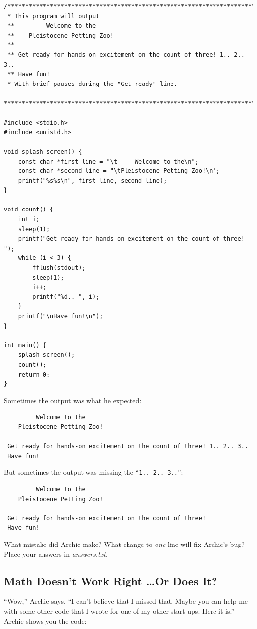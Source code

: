 \begin{lstlisting}
/***********************************************************************
 * This program will output
 **         Welcome to the
 **    Pleistocene Petting Zoo!
 **
 ** Get ready for hands-on excitement on the count of three! 1.. 2.. 3..
 ** Have fun!
 * With brief pauses during the "Get ready" line.
 ***********************************************************************/

#include <stdio.h>
#include <unistd.h>

void splash_screen() {
    const char *first_line = "\t     Welcome to the\n";
    const char *second_line = "\tPleistocene Petting Zoo!\n";
    printf("%s%s\n", first_line, second_line);
}

void count() {
    int i;
    sleep(1);
    printf("Get ready for hands-on excitement on the count of three! ");
    while (i < 3) {
        fflush(stdout);
        sleep(1);
        i++;
        printf("%d.. ", i);
    }
    printf("\nHave fun!\n");
}

int main() {
    splash_screen();
    count();
    return 0;
}
\end{lstlisting}

Sometimes the output was what he expected:
\begin{verbatim}
         Welcome to the
    Pleistocene Petting Zoo!

 Get ready for hands-on excitement on the count of three! 1.. 2.. 3..
 Have fun!
\end{verbatim}

But sometimes the output was missing the
``\texttt{1.. 2.. 3..}'':
\begin{verbatim}
         Welcome to the
    Pleistocene Petting Zoo!

 Get ready for hands-on excitement on the count of three!
 Have fun!
\end{verbatim}

What mistake did Archie make? What change to \textit{one} line will fix
Archie's bug? Place your answers in \textit{answers.txt}.

\subsection{Math Doesn't Work Right \dots Or Does It?}\label{sec:localAddresses}

``Wow,'' Archie says. ``I can't believe that I missed that. Maybe you can help
me with some other code that I wrote for one of my other start-ups. Here it
is.'' Archie shows you the code:

